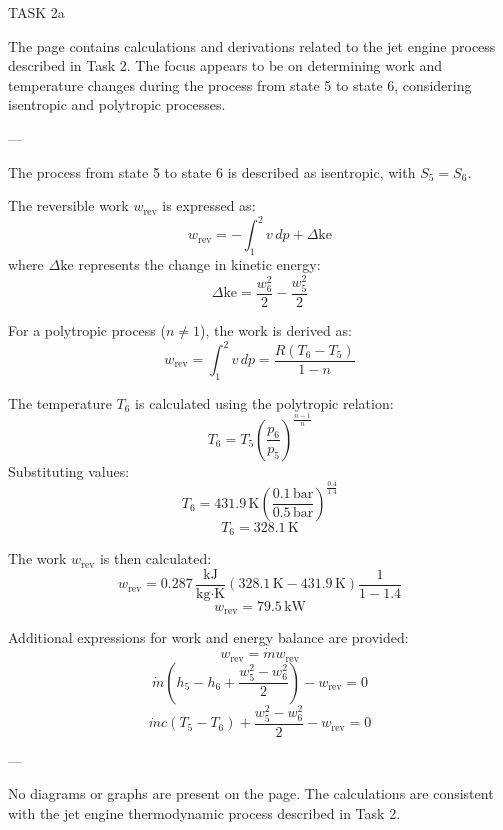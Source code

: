 TASK 2a

The page contains calculations and derivations related to the jet engine process described in Task 2. The focus appears to be on determining work and temperature changes during the process from state 5 to state 6, considering isentropic and polytropic processes.

---

The process from state 5 to state 6 is described as isentropic, with \( S_5 = S_6 \).

The reversible work \( w_{\text{rev}} \) is expressed as:
\[
w_{\text{rev}} = -\int_1^2 v \, dp + \Delta \text{ke}
\]
where \( \Delta \text{ke} \) represents the change in kinetic energy:
\[
\Delta \text{ke} = \frac{w_6^2}{2} - \frac{w_5^2}{2}
\]

For a polytropic process (\( n \neq 1 \)), the work is derived as:
\[
w_{\text{rev}} = \int_1^2 v \, dp = \frac{R (T_6 - T_5)}{1 - n}
\]

The temperature \( T_6 \) is calculated using the polytropic relation:
\[
T_6 = T_5 \left( \frac{p_6}{p_5} \right)^{\frac{n-1}{n}}
\]
Substituting values:
\[
T_6 = 431.9 \, \text{K} \left( \frac{0.1 \, \text{bar}}{0.5 \, \text{bar}} \right)^{\frac{0.4}{1.4}}
\]
\[
T_6 = 328.1 \, \text{K}
\]

The work \( w_{\text{rev}} \) is then calculated:
\[
w_{\text{rev}} = 0.287 \, \frac{\text{kJ}}{\text{kg·K}} \left( 328.1 \, \text{K} - 431.9 \, \text{K} \right) \frac{1}{1 - 1.4}
\]
\[
w_{\text{rev}} = 79.5 \, \text{kW}
\]

Additional expressions for work and energy balance are provided:
\[
w_{\text{rev}} = \dot{m} w_{\text{rev}}
\]
\[
\dot{m} \left( h_5 - h_6 + \frac{w_5^2 - w_6^2}{2} \right) - w_{\text{rev}} = 0
\]
\[
\dot{m} c (T_5 - T_6) + \frac{w_5^2 - w_6^2}{2} - w_{\text{rev}} = 0
\]

---

No diagrams or graphs are present on the page. The calculations are consistent with the jet engine thermodynamic process described in Task 2.